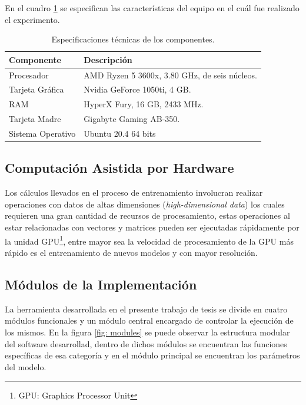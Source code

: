 En el cuadro \ref{tab:specs} se especifican las características del equipo en el cuál fue realizado el experimento.

\begin{table}[H]
    \centering
    \caption{Especificaciones técnicas de los componentes.}
    \begin{tabular}{|l|l|}
        \hline
        \bf{Componente} & \bf{Descripción} \\
        \hline
        Procesador & AMD Ryzen 5 3600x, 3.80 GHz, de seis núcleos.\\
        \hline
        Tarjeta Gráfica & Nvidia GeForce 1050ti, 4 GB. \\
        \hline
        RAM & HyperX Fury, 16 GB, 2433 MHz. \\
        \hline
        Tarjeta Madre & Gigabyte Gaming AB-350. \\
        \hline
        Sistema Operativo & Ubuntu 20.4 64 bits \\
        \hline
    \end{tabular}
    \label{tab:specs}
\end{table}

\subsection{Computación Asistida por Hardware}
Los cálculos llevados en el proceso de entrenamiento involucran realizar operaciones con datos de altas dimensiones (\emph{high-dimensional data}) los cuales requieren una gran cantidad de recursos de procesamiento, estas operaciones al estar relacionadas con vectores y matrices pueden ser ejecutadas rápidamente por la unidad GPU\footnote{GPU: Graphics Processor Unit}, entre mayor sea la velocidad de procesamiento de la GPU más rápido es el entrenamiento de nuevos modelos y con mayor resolución.

\subsection{Módulos de la Implementación}
La herramienta desarrollada en el presente trabajo de tesis se divide en cuatro módulos funcionales y un módulo central encargado de controlar la ejecución de los mismos. En la figura \ref{fig: modules} se puede observar la estructura modular del software desarrollad, dentro de dichos módulos se encuentran las funciones específicas de esa categoría y en el módulo principal se encuentran los parámetros del modelo.

